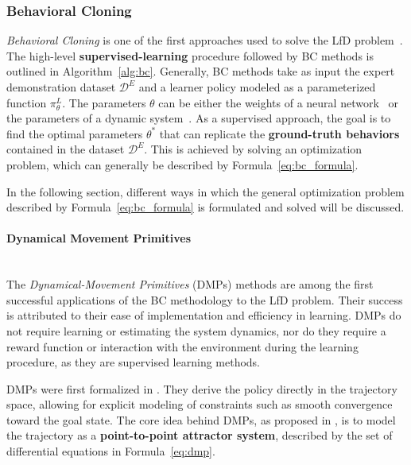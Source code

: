\subsubsection{Behavioral Cloning}
\label{sec:bc}

\textit{Behavioral Cloning} is one of the first approaches used to solve the LfD problem~\cite{pomerleau1988alvinn}. The high-level \textbf{supervised-learning} procedure followed by BC methods is outlined in Algorithm~\ref{alg:bc}. Generally, BC methods take as input the expert demonstration dataset $\mathcal{D}^{E}$ and a learner policy modeled as a parameterized function $\pi_{\theta}^{L}$. The parameters $\theta$ can be either the weights of a neural network~\cite{pomerleau1988alvinn} or the parameters of a dynamic system~\cite{ijspeert2002learning}. As a supervised approach, the goal is to find the optimal parameters $\theta^{*}$ that can replicate the \textbf{ground-truth behaviors} contained in the dataset $\mathcal{D}^{E}$. This is achieved by solving an optimization problem, which can generally be described by Formula~\ref{eq:bc_formula}.


In the following section, different ways in which the general optimization problem described by Formula~\ref{eq:bc_formula} is formulated and solved will be discussed.

\paragraph*{Dynamical Movement Primitives}\mbox{}\\
The \textit{Dynamical-Movement Primitives} (DMPs) methods are among the first successful applications of the BC methodology to the LfD problem. Their success is attributed to their ease of implementation and efficiency in learning. DMPs do not require learning or estimating the system dynamics, nor do they require a reward function or interaction with the environment during the learning procedure, as they are supervised learning methods.

DMPs were first formalized in \cite{ijspeert2002learning}. They derive the policy directly in the trajectory space, allowing for explicit modeling of constraints such as smooth convergence toward the goal state. The core idea behind DMPs, as proposed in \cite{ijspeert2002learning,ijspeert2013dynamical}, is to model the trajectory as a \textbf{point-to-point attractor system}, described by the set of differential equations in Formula~\ref{eq:dmp}.



